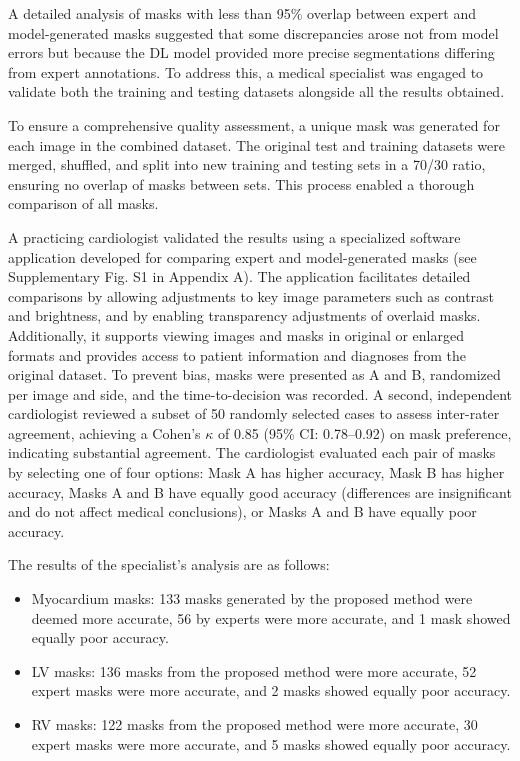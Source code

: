 \documentclass[fleqn,10pt]{wlscirep}
\begin{document}
A detailed analysis of masks with less than 95\% overlap between expert and model-generated masks suggested that some discrepancies arose not from model errors but because the DL model provided more precise segmentations differing from expert annotations. To address this, a medical specialist was engaged to validate both the training and testing datasets alongside all the results obtained.

To ensure a comprehensive quality assessment, a unique mask was generated for each image in the combined dataset. The original test and training datasets were merged, shuffled, and split into new training and testing sets in a 70/30 ratio, ensuring no overlap of masks between sets. This process enabled a thorough comparison of all masks.

A practicing cardiologist validated the results using a specialized software application developed for comparing expert and model-generated masks (see Supplementary Fig. S1 in Appendix A). The application facilitates detailed comparisons by allowing adjustments to key image parameters such as contrast and brightness, and by enabling transparency adjustments of overlaid masks. Additionally, it supports viewing images and masks in original or enlarged formats and provides access to patient information and diagnoses from the original dataset. To prevent bias, masks were presented as A and B, randomized per image and side, and the time-to-decision was recorded. A second, independent cardiologist reviewed a subset of 50 randomly selected cases to assess inter-rater agreement, achieving a Cohen's \(\kappa\) of 0.85 (95\% CI: 0.78--0.92) on mask preference, indicating substantial agreement. The cardiologist evaluated each pair of masks by selecting one of four options: Mask A has higher accuracy, Mask B has higher accuracy, Masks A and B have equally good accuracy (differences are insignificant and do not affect medical conclusions), or Masks A and B have equally poor accuracy.

The results of the specialist's analysis are as follows:

\begin{itemize}
    \item Myocardium masks: 133 masks generated by the proposed method were deemed more accurate, 56 by experts were more accurate, and 1 mask showed equally poor accuracy.
    \item LV masks: 136 masks from the proposed method were more accurate, 52 expert masks were more accurate, and 2 masks showed equally poor accuracy.
    \item RV masks: 122 masks from the proposed method were more accurate, 30 expert masks were more accurate, and 5 masks showed equally poor accuracy.
\end{itemize}
\end{document}

